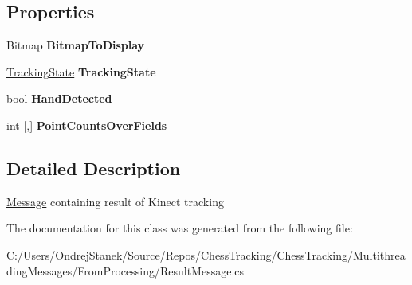 \subsection*{Properties}
\begin{DoxyCompactItemize}
\item 
\mbox{\label{class_chess_tracking_1_1_multithreading_messages_1_1_result_message_a84cf4261532e8b0d82f2341eb74d93c9}} 
Bitmap {\bfseries Bitmap\+To\+Display}
\item 
\mbox{\label{class_chess_tracking_1_1_multithreading_messages_1_1_result_message_a00386a12f9730902efaa9a06bc9e8c68}} 
\mbox{\hyperlink{class_chess_tracking_1_1_multithreading_messages_1_1_tracking_state}{Tracking\+State}} {\bfseries Tracking\+State}
\item 
\mbox{\label{class_chess_tracking_1_1_multithreading_messages_1_1_result_message_aed667892cfffcbd7d87690eedd07db9d}} 
bool {\bfseries Hand\+Detected}
\item 
\mbox{\label{class_chess_tracking_1_1_multithreading_messages_1_1_result_message_ac631aa5cbf95b241fec31fccaa82930f}} 
int \mbox{[},\mbox{]} {\bfseries Point\+Counts\+Over\+Fields}
\end{DoxyCompactItemize}


\subsection{Detailed Description}
\mbox{\hyperlink{class_chess_tracking_1_1_multithreading_messages_1_1_message}{Message}} containing result of Kinect tracking 



The documentation for this class was generated from the following file\+:\begin{DoxyCompactItemize}
\item 
C\+:/\+Users/\+Ondrej\+Stanek/\+Source/\+Repos/\+Chess\+Tracking/\+Chess\+Tracking/\+Multithreading\+Messages/\+From\+Processing/Result\+Message.\+cs\end{DoxyCompactItemize}
